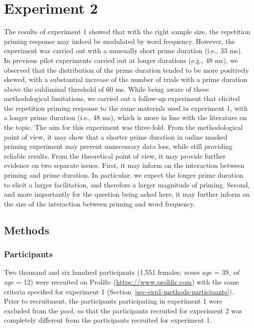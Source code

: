 \documentclass[
]{interact}
\begin{document}
\section{Experiment 2}\label{sec-exp2}

The results of experiment 1 showed that with the right sample size, the
repetition priming response may indeed be modulated by word frequency.
However, the experiment was carried out with a unusually short prime
duration (i.e., 33 ms). In previous pilot experiments carried out at
longer durations (e.g., 48 ms), we observed that the distribution of the
prime duration tended to be more positively skewed, with a substantial
increase of the number of trials with a prime duration above the
subliminal threshold of 60 ms. While being aware of these methodological
limitations, we carried out a follow-up experiment that elicited the
repetition priming response to the same materials used in experiment 1,
with a longer prime duration (i.e., 48 ms), which is more in line with
the literature on the topic. The aim for this experiment was three-fold.
From the methodological point of view, it may show that a shorter prime
duration in online masked priming experiment may prevent unnecessary
data loss, while still providing reliable results. From the theoretical
point of view, it may provide further evidence on two separate issues.
First, it may inform on the interaction between priming and prime
duration. In particular, we expect the longer prime duration to elicit a
larger facilitation, and therefore a larger magnitude of priming.
Second, and more importantly for the question being asked here, it may
further inform on the size of the interaction between priming and word
frequency.

\subsection{Methods}\label{sec-exp2-methods}

\subsubsection{Participants}\label{sec-exp2-methods-participants}

Two thousand and six hundred participants (1,551 females; \emph{mean
age} = 39, \emph{sd age} = 12) were recruited on Prolific
(\url{https://www.prolific.com}) with the same criteria specified for
experiment 1 (Section~\ref{sec-exp1-methods-participants}). Prior to
recruitment, the participants participating in experiment 1 were
excluded from the pool, so that the participants recruited for
experiment 2 was completely different from the participants recruited
for experiment 1.
\end{document}
